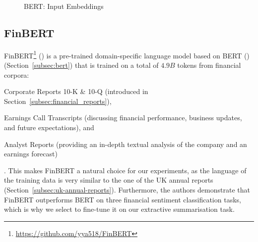 \begin{figure}[ht]
    \caption{BERT: Input Embeddings}
    \label{fig:bert_input}
\end{figure}

\subsection{FinBERT}\label{subsec:finbert}
FinBERT\footnote{\url{https://github.com/yya518/FinBERT}} (\cite{yang2020finbert}) is a pre-trained domain-specific language model based on
BERT (\cite{devlin-etal-2019-bert}) (Section~\ref{subsec:bert}) that is trained on a total of $4.9B$ tokens from financial corpora:
\begin{enumerate*}
    \item Corporate Reports 10-K \& 10-Q (introduced in Section~\ref{subsec:financial_reports}),
    \item Earnings Call Transcripts (discussing financial performance, business updates, and future expectations), and
    \item Analyst Reports (providing an in-depth textual analysis of the company and an earnings forecast)
\end{enumerate*}.
This makes FinBERT a natural choice for our experiments, as the language of the training data is very similar to the one of the UK annual reports (Section~\ref{subsec:uk-annual-reports}).
Furthermore, the authors demonstrate that FinBERT outperforms BERT on three financial sentiment classification tasks, which is why we select to fine-tune it on our extractive summarisation task.

